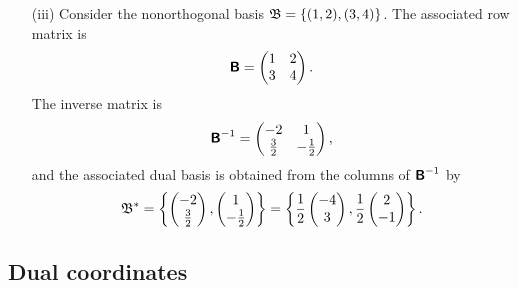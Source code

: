 {\begin{itemize}
\item[(iii)]
Consider the nonorthogonal basis
${\frak B} =
\{(1, 2), (3, 4)\}$.
The associated row matrix is
$$
\textsf{\textbf{B}}
=
\begin{pmatrix}
1&2\\
3&4
\end{pmatrix}
.
$$
The inverse matrix is
$$
\textsf{\textbf{B}}^{-1}
=
\begin{pmatrix}
-2&1\\
\frac{3}{2}&-\frac{1}{2}
\end{pmatrix}
,
$$
and the associated dual basis is obtained from the columns of $\textsf{\textbf{B}}^{-1} $ by
\begin{equation}
{\frak B}^* =
\left\{
\begin{pmatrix}
-2\\
\frac{3}{2}
\end{pmatrix},
\begin{pmatrix}
1\\
-\frac{1}{2}
\end{pmatrix}
\right\} =
\left\{\frac{1}{2}
\begin{pmatrix}
-4\\
3
\end{pmatrix},
\frac{1}{2}
\begin{pmatrix}
2\\
-1
\end{pmatrix}
\right\}
.
\label{2011-m-cenobdb}
\end{equation}
\eexample
\end{itemize}
}


\subsection{Dual coordinates}

